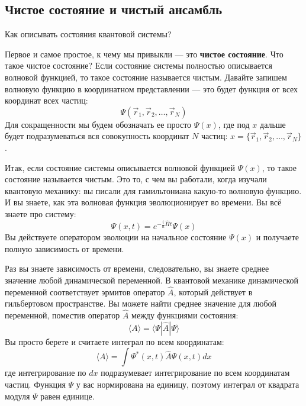 \documentclass[../general/general]{subfiles}
\begin{document}
\subsection{Чистое состояние и чистый ансамбль}

Как описывать состояния квантовой системы? 

Первое и самое простое, к чему мы привыкли — это \textbf{чистое состояние}. 
Что такое чистое состояние? Если состояние системы полностью описывается волновой функцией, то такое состояние называется чистым. Давайте запишем волновую функцию в координатном представлении — это будет функция от всех координат всех частиц:
\begin{equation}
    \Psi(\vec{r}_1, \vec{r}_2, \dots, \vec{r}_N)
\end{equation}
Для сокращенности мы будем обозначать ее просто $\Psi(x)$, где под $x$ дальше будет подразумеваться вся совокупность координат $N$ частиц: $x = \{\vec{r}_1, \vec{r}_2, \dots, \vec{r}_N\}$.

Итак, если состояние системы описывается волновой функцией $\Psi(x)$, то такое состояние называется чистым. Это то, с чем вы работали, когда изучали квантовую механику: вы писали для гамильтониана какую-то волновую функцию. И вы знаете, как эта волновая функция эволюционирует во времени. Вы всё знаете про систему:
\begin{equation}
    \Psi(x, t) = e^{-\frac{i}{\hbar}\hat{H}t} \Psi(x)
\end{equation}
Вы действуете оператором эволюции на начальное состояние $\Psi(x)$ и получаете полную зависимость от времени. 

Раз вы знаете зависимость от времени, следовательно, вы знаете среднее значение любой динамической переменной. В квантовой механике динамической переменной соответствует эрмитов оператор $\hat{A}$, который действует в гильбертовом пространстве. Вы можете найти среднее значение для любой переменной, поместив оператор $\hat{A}$ между функциями состояния:
\begin{equation}
    \langle A \rangle = \langle \Psi | \hat{A} | \Psi \rangle
\end{equation}
Вы просто берете и считаете интеграл по всем координатам:
\begin{equation}
    \langle A \rangle = \int \Psi^*(x, t) \hat{A} \Psi(x, t) dx \label{eq:pure_mean}
\end{equation}
где интегрирование по $dx$ подразумевает интегрирование по всем координатам частиц. Функция $\Psi$ у вас нормирована на единицу, поэтому интеграл от квадрата модуля $\Psi$ равен единице. 
\end{document}
